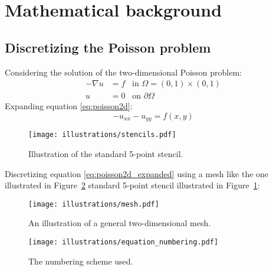 
\section{Mathematical background} %

\subsection{Discretizing the Poisson problem}
\label{sec:discretizing_the_poisson_problem}
Considering the solution of the two-dimensional Poisson problem:
\begin{align}
  - \nabla u &= f \;\;\; \text{in } \Omega = (0,1) \times (0,1) \label{eq:poisson2d} \\
  u &= 0 \;\;\; \text{on } \partial \Omega \label{eq:poisson2d_edge}
\end{align}
Expanding equation \eqref{eq:poisson2d}:
\begin{equation}
  -u_{xx} - u_{yy} = f(x,y) \label{eq:poisson2d_expanded}
\end{equation}

\begin{figure}[htbp]
  \centering
  \texttt{[image: illustrations/stencils.pdf]}
  \caption{Illustration of the standard 5-point stencil.}
  \label{fig:stencil}
\end{figure}

Discretizing equation \eqref{eq:poisson2d_expanded} using a mesh like the one illustrated in Figure~\ref{fig:mesh} standard 5-point stencil illustrated in Figure~\ref{fig:stencil}:

\begin{figure}[htbp]
  \centering
  \texttt{[image: illustrations/mesh.pdf]}
  \caption{An illustration of a general two-dimensional mesh.}
  \label{fig:mesh}
\end{figure}

\begin{figure}[htbp]
  \centering
  \texttt{[image: illustrations/equation\_numbering.pdf]}
  \caption{The numbering scheme used.}
  \label{fig:numbering_scheme}
\end{figure}


